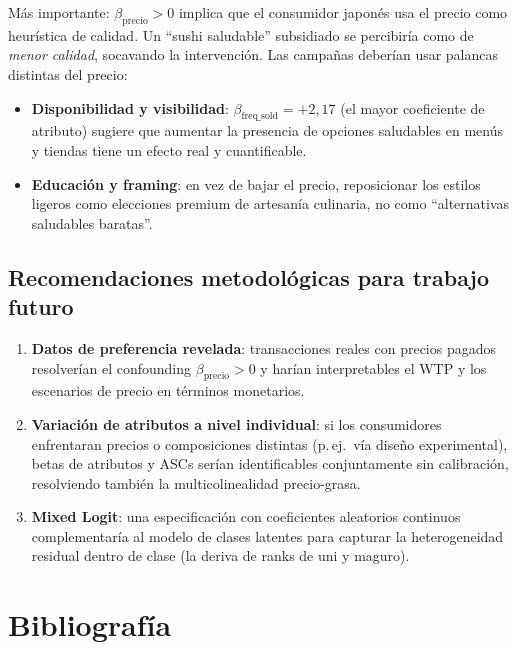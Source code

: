 \documentclass[12pt,a4paper]{article}
\begin{document}
Más importante: $\beta_{\text{precio}} > 0$ implica que el consumidor japonés usa el precio como heurística de calidad. Un ``sushi saludable'' subsidiado se percibiría como de \emph{menor calidad}, socavando la intervención. Las campañas deberían usar palancas distintas del precio:
\begin{itemize}[nosep]
  \item \textbf{Disponibilidad y visibilidad}: $\beta_{\text{freq\_sold}} = +2{,}17$ (el mayor coeficiente de atributo) sugiere que aumentar la presencia de opciones saludables en menús y tiendas tiene un efecto real y cuantificable.
  \item \textbf{Educación y framing}: en vez de bajar el precio, reposicionar los estilos ligeros como elecciones premium de artesanía culinaria, no como ``alternativas saludables baratas''.
\end{itemize}

\subsection{Recomendaciones metodológicas para trabajo futuro}

\begin{enumerate}[nosep]
  \item \textbf{Datos de preferencia revelada}: transacciones reales con precios pagados resolverían el confounding $\beta_{\text{precio}} > 0$ y harían interpretables el WTP y los escenarios de precio en términos monetarios.
  \item \textbf{Variación de atributos a nivel individual}: si los consumidores enfrentaran precios o composiciones distintas (p.\,ej.\ vía diseño experimental), betas de atributos y ASCs serían identificables conjuntamente sin calibración, resolviendo también la multicolinealidad precio-grasa.
  \item \textbf{Mixed Logit}: una especificación con coeficientes aleatorios continuos complementaría al modelo de clases latentes para capturar la heterogeneidad residual dentro de clase (la deriva de ranks de uni y maguro).
\end{enumerate}

\newpage
\section*{Bibliografía}
\end{document}

